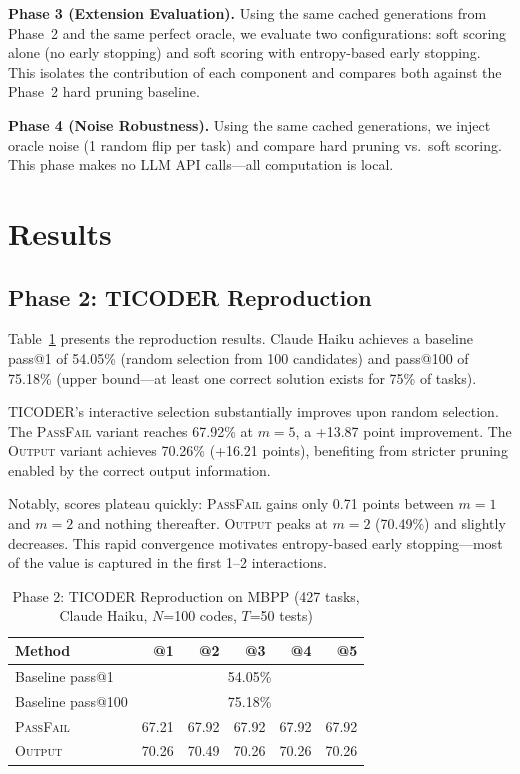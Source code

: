 \documentclass[conference]{IEEEtran}
\begin{document}
\textbf{Phase 3 (Extension Evaluation).} Using the same cached generations from Phase~2 and the same perfect oracle, we evaluate two configurations: soft scoring alone (no early stopping) and soft scoring with entropy-based early stopping. This isolates the contribution of each component and compares both against the Phase~2 hard pruning baseline.

\textbf{Phase 4 (Noise Robustness).} Using the same cached generations, we inject oracle noise (1 random flip per task) and compare hard pruning vs.\ soft scoring. This phase makes no LLM API calls---all computation is local.

\section{Results}

\subsection{Phase 2: TICODER Reproduction}

Table~\ref{tab:phase2} presents the reproduction results. Claude Haiku achieves a baseline pass@1 of 54.05\% (random selection from 100 candidates) and pass@100 of 75.18\% (upper bound---at least one correct solution exists for 75\% of tasks).

TICODER's interactive selection substantially improves upon random selection. The \textsc{PassFail} variant reaches 67.92\% at $m=5$, a +13.87 point improvement. The \textsc{Output} variant achieves 70.26\% (+16.21 points), benefiting from stricter pruning enabled by the correct output information.

Notably, scores plateau quickly: \textsc{PassFail} gains only 0.71 points between $m=1$ and $m=2$ and nothing thereafter. \textsc{Output} peaks at $m=2$ (70.49\%) and slightly decreases. This rapid convergence motivates entropy-based early stopping---most of the value is captured in the first 1--2 interactions.

\begin{table}[t]
\centering
\caption{Phase 2: TICODER Reproduction on MBPP (427 tasks, Claude Haiku, $N$=100 codes, $T$=50 tests)}
\label{tab:phase2}
\begin{tabular}{lrrrrr}
\toprule
\textbf{Method} & \textbf{@1} & \textbf{@2} & \textbf{@3} & \textbf{@4} & \textbf{@5} \\
\midrule
Baseline pass@1 & \multicolumn{5}{c}{54.05\%} \\
Baseline pass@100 & \multicolumn{5}{c}{75.18\%} \\
\midrule
\textsc{PassFail} & 67.21 & 67.92 & 67.92 & 67.92 & 67.92 \\
\textsc{Output} & 70.26 & 70.49 & 70.26 & 70.26 & 70.26 \\
\bottomrule
\end{tabular}
\end{table}
\end{document}

